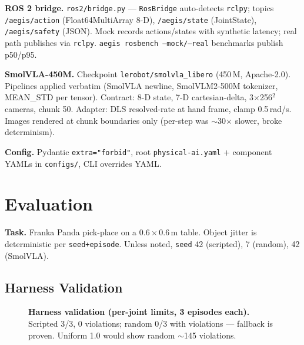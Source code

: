 \documentclass[11pt,a4paper,twocolumn]{article}
\begin{document}
\textbf{ROS 2 bridge.} \texttt{ros2/bridge.py} --- \texttt{RosBridge} auto-detects \texttt{rclpy}; topics \texttt{/aegis/action} (Float64MultiArray 8-D), \texttt{/aegis/state} (JointState), \texttt{/aegis/safety} (JSON). Mock records actions/states with synthetic latency; real path publishes via \texttt{rclpy}. \texttt{aegis rosbench --mock/--real} benchmarks publish p50/p95.

\textbf{SmolVLA-450M.} Checkpoint \texttt{lerobot/smolvla\_libero} (450\,M, Apache-2.0). Pipelines applied verbatim (SmolVLA newline, SmolVLM2-500M tokenizer, MEAN\_STD per tensor). Contract: 8-D state, 7-D cartesian-delta, 3$\times$256$^2$ cameras, chunk 50. Adapter: DLS resolved-rate at hand frame, clamp 0.5\,rad/s. Images rendered at chunk boundaries only (per-step was $\sim$30$\times$ slower, broke determinism).

\textbf{Config.} Pydantic \texttt{extra="forbid"}, root \texttt{physical-ai.yaml} + component YAMLs in \texttt{configs/}, CLI overrides YAML.

\section{Evaluation}
\label{sec:eval}

\textbf{Task.} Franka Panda pick-place on a $0.6\times0.6$\,m table. Object jitter is deterministic per \texttt{seed+episode}. Unless noted, \texttt{seed} 42 (scripted), 7 (random), 42 (SmolVLA).

\subsection{Harness Validation}

\begin{figure}[htbp]
\centering
{}
\caption{\textbf{Harness validation (per-joint limits, 3 episodes each).} Scripted 3/3, 0 violations; random 0/3 with violations --- fallback is proven. Uniform 1.0 would show random $\sim$145 violations.}
\label{fig:validation}
\end{figure}
\end{document}
